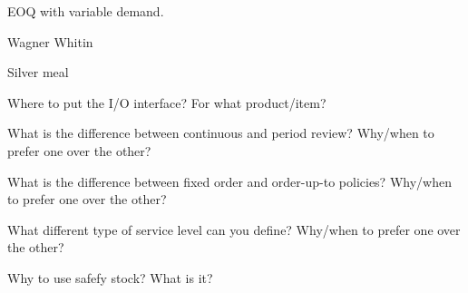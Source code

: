 \begin{exercise}
EOQ with variable demand.

\end{exercise}

\begin{exercise}
Wagner Whitin

\end{exercise}

\begin{exercise}
Silver meal

\end{exercise}

\begin{exercise}
Where to put the I/O interface? For what product/item?

\end{exercise}

\begin{exercise}
  What is the difference between continuous and period review? Why/when to prefer one over the other?

\end{exercise}

\begin{exercise}
  What is the difference between fixed order and order-up-to policies?
  Why/when to prefer one over the other?

\end{exercise}

\begin{exercise}
  What  different type of service level can you define?
  Why/when to prefer one over the other?

\end{exercise}

\begin{exercise}
  Why to use safefy stock? What is it? 

\end{exercise}

